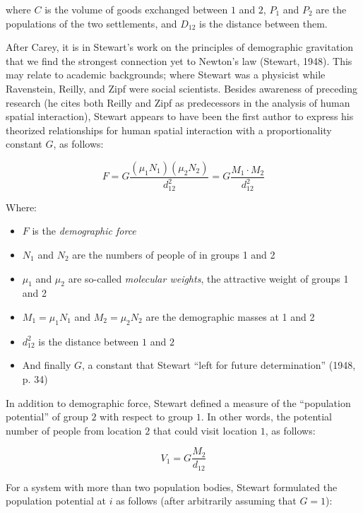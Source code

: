 \documentclass[
11pt, %
oneside, %
english, %
singlespacing, %
]{macthesis} %
\def\tightlist{}
\begin{document}
\noindent where \(C\) is the volume of goods exchanged between \(1\) and \(2\), \(P_1\) and \(P_2\) are the populations of the two settlements, and \(D_{12}\) is the distance between them.

After Carey, it is in Stewart's work on the principles of demographic gravitation that we find the strongest connection yet to Newton's law (Stewart, 1948). This may relate to academic backgrounds; where Stewart was a physicist while Ravenstein, Reilly, and Zipf were social scientists. Besides awareness of preceding research (he cites both Reilly and Zipf as predecessors in the analysis of human spatial interaction), Stewart appears to have been the first author to express his theorized relationships for human spatial interaction with a proportionality constant \(G\), as follows:

\begin{equation}
\label{eq:stewart-force}
F = G\frac{(\mu_1N_1)(\mu_2N_2)}{d_{12}^2} = G\frac{M_1\cdot M_2}{d_{12}^2} 
\end{equation} 

\noindent Where:

\begin{itemize}
\tightlist
\item
  \(F\) is the \emph{demographic force}
\item
  \(N_1\) and \(N_2\) are the numbers of people of in groups 1 and 2
\item
  \(\mu_1\) and \(\mu_2\) are so-called \emph{molecular weights}, the attractive weight of groups 1 and 2
\item
  \(M_1 = \mu_1N_1\) and \(M_2 = \mu_2N_2\) are the demographic masses at 1 and 2
\item
  \(d_{12}^2\) is the distance between \(1\) and \(2\)
\item
  And finally \(G\), a constant that Stewart ``left for future determination'' (1948, p. 34)
\end{itemize}

In addition to demographic force, Stewart defined a measure of the ``population potential'' of group \(2\) with respect to group \(1\). In other words, the potential number of people from location \(2\) that could visit location \(1\), as follows:

\begin{equation}
\label{eq:stewart-population-potential}
V_1 = G\frac{M_2}{d_{12}}
\end{equation} 

For a system with more than two population bodies, Stewart formulated the population potential at \(i\) as follows (after arbitrarily assuming that \(G=1\)):
\end{document}
